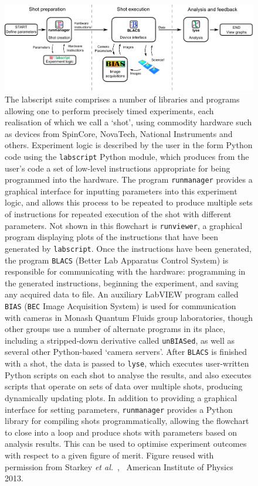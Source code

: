 \begin{figure}
\begin{center}
\includegraphics[width=\textwidth]{figures/software/flow_chart_simple-eps-converted-to.pdf}
\caption{The labscript suite comprises a number of libraries and programs allowing one to perform precisely timed experiments, each realisation of which we call a `shot', using commodity hardware such as devices from SpinCore, NovaTech, National Instruments and others. Experiment logic is described by the user in the form Python code using the \texttt{labscript} Python module, which produces from the user's code a set of low-level instructions appropriate for being programmed into the hardware. The program \texttt{runmanager} provides a graphical interface for inputting parameters into this experiment logic, and allows this process to be repeated to produce multiple sets of instructions for repeated execution of the shot with different parameters. Not shown in this flowchart is \texttt{runviewer}, a graphical program displaying plots of the instructions that have been generated by \texttt{labscript}. Once the instructions have been generated, the program \texttt{BLACS} (Better Lab Apparatus Control System) is responsible for communicating with the hardware: programming in the generated instructions, beginning the experiment, and saving any acquired data to file. An auxiliary LabVIEW program called \texttt{BIAS} (\texttt{BEC} Image Acquisition System) is used for communication with cameras in Monash Quantum Fluids group laboratories, though other groups use a number of alternate programs in its place, including a stripped-down derivative called \texttt{unBIASed}, as well as several other Python-based `camera servers'. After \texttt{BLACS} is finished with a shot, the data is passed to \texttt{lyse}, which executes user-written Python scripts on each shot to analyse the results, and also executes scripts that operate on sets of data over multiple shots, producing dynamically updating plots. In addition to providing a graphical interface for setting parameters, \texttt{runmanager} provides a Python library for compiling shots programmatically, allowing the flowchart to close into a loop and produce shots with parameters based on analysis results. This can be used to optimise experiment outcomes with respect to a given figure of merit. Figure reused with permission from Starkey \emph{\emph{et al.}}~\cite{starkey_scripted_2013}, \textcopyright\ American Institute of Physics 2013.}\label{fig:labscript_flowchart}
\end{center}
\end{figure}

